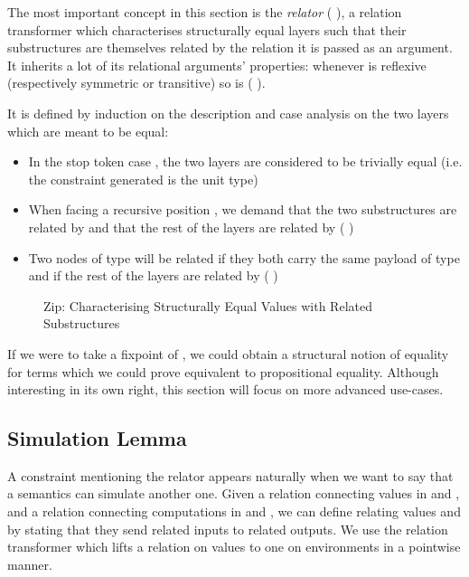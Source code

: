 The most important concept in this section is the \emph{relator} (  ),
a relation transformer which characterises structurally equal layers such that their
substructures are themselves related by the relation it is passed as an
argument. It inherits a lot of its relational arguments' properties: whenever
 is reflexive (respectively symmetric or transitive) so is {(   )}.\label{lem:zipstable}

It is defined by induction on the description and case analysis on the two
layers which are meant to be equal:
\begin{itemize}
  \item In the stop token case  , the two layers are considered to
    be trivially equal (i.e. the constraint generated is the unit type)
  \item When facing a recursive position { \AB{$\Delta$}  }, we
    demand that the two substructures are related by { \AB{$\Delta$} }
    and that the rest of the layers are related by (   )
  \item Two nodes of type {  } will
    be related if they both carry the same payload  of type  and if
    the rest of the layers are related by (    )
\end{itemize}

\begin{figure}[h]
\caption{Zip: Characterising Structurally Equal Values with Related Substructures}
\end{figure}

If we were to take a fixpoint of , we could obtain a structural
notion of equality for terms which we could prove equivalent to propositional
equality. Although interesting in its own right, this section will focus
on more advanced use-cases.



\subsection{Simulation Lemma}\label{section:simulation}

A constraint mentioning the relator appears naturally when we want to say that a
semantics can simulate another one. Given a relation  connecting values
in  and , and a relation  connecting computations in
 and , we can define  relating values
   and   
by stating that they send related inputs to related outputs. We use
the relation transformer  which lifts a relation on values
to one on environments in a pointwise manner.

